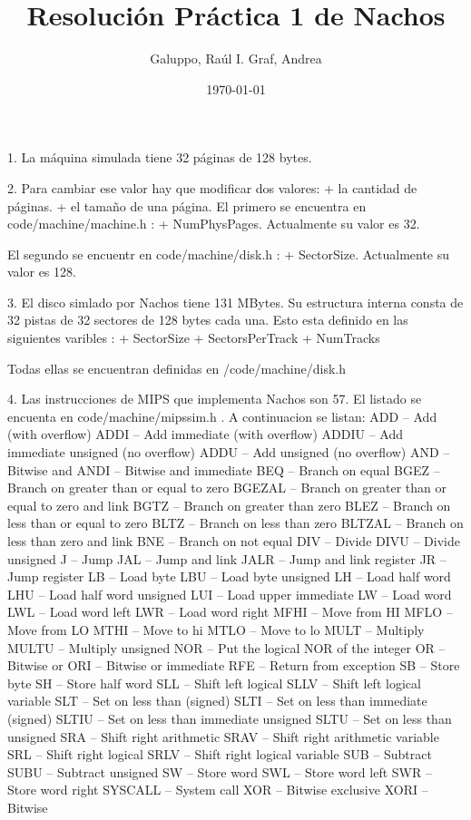 \documentclass[a4paper, 11pt]{article}
\title{Resolución Práctica 1 de Nachos}
\author{Galuppo, Raúl I. Graf, Andrea}
\date{\today}
\begin{document}
\maketitle

1.  La máquina simulada tiene 32 páginas de 128 bytes.

2.  Para cambiar ese valor hay que modificar dos valores:
            + la cantidad de páginas.
            + el tamaño de una página.
    El primero se encuentra en code/machine/machine.h :
        + NumPhysPages. Actualmente su valor es 32.

    El segundo se encuentr en code/machine/disk.h :
        + SectorSize. Actualmente su valor es 128.

3. El disco simlado por Nachos tiene 131 MBytes. Su estructura interna consta de 32 pistas de 32 sectores de 128 bytes cada una. Esto esta definido en las siguientes varibles :
    + SectorSize
    + SectorsPerTrack
    + NumTracks

Todas ellas se encuentran definidas en /code/machine/disk.h

4. Las instrucciones de MIPS que implementa Nachos son 57. El listado se encuenta en code/machine/mipssim.h . A continuacion se listan:
ADD – Add (with overflow)
ADDI -- Add immediate (with overflow)
ADDIU -- Add immediate unsigned (no overflow)
ADDU -- Add unsigned (no overflow)
AND -- Bitwise and
ANDI -- Bitwise and immediate
BEQ -- Branch on equal
BGEZ -- Branch on greater than or equal to zero
BGEZAL -- Branch on greater than or equal to zero and link
BGTZ -- Branch on greater than zero
BLEZ -- Branch on less than or equal to zero
BLTZ -- Branch on less than zero
BLTZAL -- Branch on less than zero and link
BNE -- Branch on not equal
DIV -- Divide
DIVU -- Divide unsigned
J -- Jump
JAL -- Jump and link
JALR -- Jump and link register
JR -- Jump register
LB -- Load byte
LBU -- Load byte unsigned
LH -- Load half word
LHU -- Load half word unsigned
LUI -- Load upper immediate
LW -- Load word
LWL -- Load word left
LWR -- Load word right
MFHI -- Move from HI
MFLO -- Move from LO
MTHI -- Move to hi
MTLO -- Move to lo
MULT -- Multiply
MULTU -- Multiply unsigned
NOR -- Put the logical NOR of the integer
OR -- Bitwise or
ORI -- Bitwise or immediate
RFE -- Return from exception
SB -- Store byte
SH -- Store half word 
SLL -- Shift left logical
SLLV -- Shift left logical variable
SLT -- Set on less than (signed)
SLTI -- Set on less than immediate (signed)
SLTIU -- Set on less than immediate unsigned
SLTU -- Set on less than unsigned
SRA -- Shift right arithmetic
SRAV -- Shift right arithmetic variable
SRL -- Shift right logical
SRLV -- Shift right logical variable
SUB -- Subtract
SUBU -- Subtract unsigned
SW -- Store word
SWL -- Store word left
SWR -- Store word right
SYSCALL -- System call
XOR -- Bitwise exclusive
XORI -- Bitwise
\end{document}
